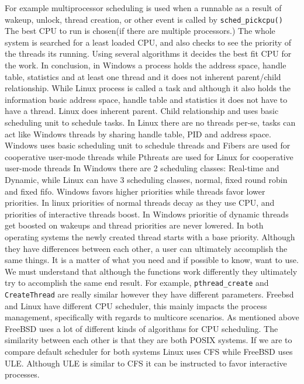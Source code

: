 \documentclass[letterpaper,10pt,draftclsnofoot,onecolumn]{IEEEtran}
\begin{document}
For example multiprocessor scheduling is used when a runnable as a result of wakeup, unlock, thread creation, or other event is called by \verb|sched_pickcpu()| The best CPU to run is chosen(if there are multiple processors.) The whole system is searched for a least loaded CPU, and also checks to see the priority of the threads its running. Using several algorithms it decides the best fit CPU for the work.\cite{[2]}
In conclusion, in Windows a process holds the address space, handle table, statistics and at least one thread and it does not inherent parent/child relationship. While Linux process is called a task and although it also holds the information basic address space, handle table and statistics it does not have to have a thread. Linux does inherent parent. Child relationship and uses basic scheduling unit to schedule tasks. In Linux there are no threads per-se, tasks can act like Windows threads by sharing handle table, PID and address space. Windows uses basic scheduling unit to schedule threads and Fibers are used for cooperative user-mode threads while Pthreats are used for Linux for cooperative user-mode threads
In Windows there are 2 scheduling classes: Real-time and Dynamic, while Linux can have 3 scheduling classes, normal, fixed round robin and fixed fifo. Windows favors higher priorities while threads favor lower priorities. In linux priorities of normal threads decay as they use CPU, and priorities of interactive threads boost. In Windows prioritie of dynamic threads get boosted on wakeups and thread priorities are never lowered. In both operating systems the newly created thread starts with a base priority.
Although they have differences between each other, a user can ultimately accomplish the same things. It is a matter of what you need and if possible to know, want to use. We must understand that although the functions work differently they ultimately try to accomplish the same end result. For example, \verb|pthread_create| and \verb|CreateThread| are really similar however they have different parameters.
Freebsd and Linux have different CPU scheduler, this mainly impacts the process management, specifically with regards to multicore scenarios. As mentioned above FreeBSD uses a lot of different kinds of algorithms for CPU scheduling. The similarity between each other is that they are both POSIX systems. If we are to compare default scheduler for both systems Linux uses CFS while FreeBSD uses ULE. Although ULE is similar to CFS it can be instructed to favor interactive processes.



\end{document}
